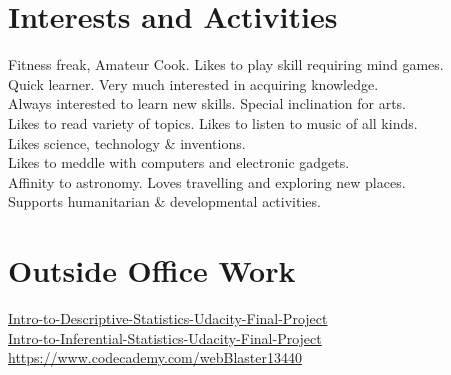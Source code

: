 \documentclass[a4paper,10pt]{article} %
\begin{document}

\section{Interests and Activities}
Fitness freak, Amateur Cook. Likes to play skill requiring mind games.\\
Quick learner. Very much interested in acquiring knowledge.\\
Always interested to learn new skills. Special inclination for arts.\\
Likes to read variety of topics. Likes to listen to music of all kinds.\\
Likes science, technology \& inventions.\\
Likes to meddle with computers and electronic gadgets.\\
Affinity to astronomy. Loves travelling and exploring new places.\\
Supports humanitarian \& developmental activities.

\section{Outside Office Work}
\href{https://docs.google.com/spreadsheets/d/119tlJCNgTcg1RGLWL1T5nZH0Lj7HAtEktJBymnpFkQA/edit?usp=sharing}{Intro-to-Descriptive-Statistics-Udacity-Final-Project}\\
\href{https://docs.google.com/spreadsheets/d/1fLTxtzmr2lL2DZbYCNN3SOrq32Kvs1yG5MDb5RsWkL0/edit?usp=sharing}{Intro-to-Inferential-Statistics-Udacity-Final-Project}\\
\href{https://www.codecademy.com/webBlaster13440}{https://www.codecademy.com/webBlaster13440}

\end{document}
